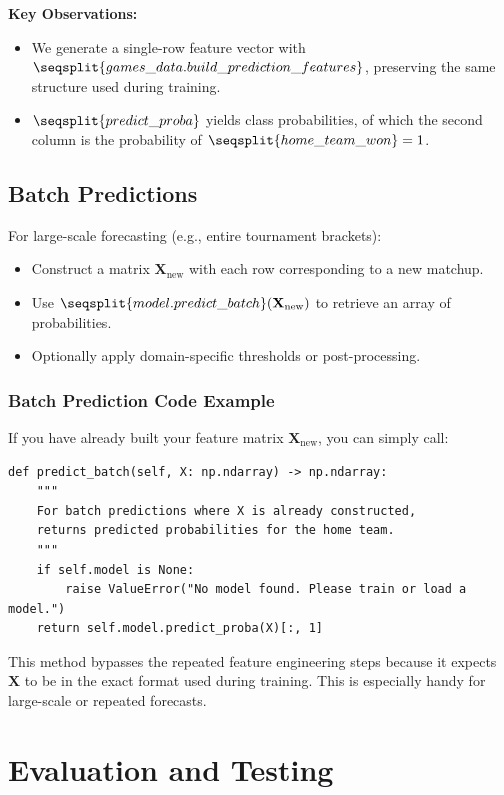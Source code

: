 \documentclass[12pt]{article}
\begin{document}
\noindent
\textbf{Key Observations:}
\begin{itemize}
    \item We generate a single-row feature vector with \(\seqsplit{games\_data.build\_prediction\_features}\), preserving the same structure used during training.
    \item \(\seqsplit{predict\_proba}\) yields class probabilities, of which the second column is the probability of \(\seqsplit{home\_team\_won} = 1\).
\end{itemize}

\subsection{Batch Predictions}
For large-scale forecasting (e.g., entire tournament brackets):
\begin{itemize}[noitemsep]
    \item Construct a matrix \(\mathbf{X}_{\text{new}}\) with each row corresponding to a new matchup.
    \item Use \(\seqsplit{model.predict\_batch}(\mathbf{X}_{\text{new}})\) to retrieve an array of probabilities.
    \item Optionally apply domain-specific thresholds or post-processing.
\end{itemize}

\subsubsection{Batch Prediction Code Example}
If you have already built your feature matrix \(\mathbf{X}_{\text{new}}\), you can simply call:

\begin{verbatim}
def predict_batch(self, X: np.ndarray) -> np.ndarray:
    """
    For batch predictions where X is already constructed,
    returns predicted probabilities for the home team.
    """
    if self.model is None:
        raise ValueError("No model found. Please train or load a model.")
    return self.model.predict_proba(X)[:, 1]
\end{verbatim}

\noindent
This method bypasses the repeated feature engineering steps because it expects \(\mathbf{X}\) to be in the exact format used during training. This is especially handy for large-scale or repeated forecasts.
\section{Evaluation and Testing}
\label{sec:evaluation_testing}
\end{document}
